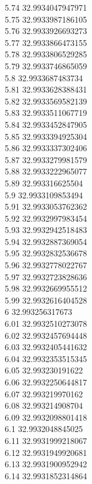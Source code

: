 {5.74	32.9934047947971\\
5.75	32.9933987186105\\
5.76	32.9933926693273\\
5.77	32.9933866473155\\
5.78	32.9933806529285\\
5.79	32.9933746865059\\
5.8	32.9933687483734\\
5.81	32.9933628388431\\
5.82	32.9933569582139\\
5.83	32.9933511067719\\
5.84	32.9933452847905\\
5.85	32.9933394925304\\
5.86	32.9933337302406\\
5.87	32.9933279981579\\
5.88	32.9933222965077\\
5.89	32.993316625504\\
5.9	32.9933109853494\\
5.91	32.9933053762362\\
5.92	32.9932997983454\\
5.93	32.9932942518483\\
5.94	32.9932887369054\\
5.95	32.9932832536678\\
5.96	32.9932778022767\\
5.97	32.9932723828636\\
5.98	32.9932669955512\\
5.99	32.9932616404528\\
6	32.993256317673\\
6.01	32.9932510273078\\
6.02	32.9932457694448\\
6.03	32.9932405441632\\
6.04	32.9932353515345\\
6.05	32.993230191622\\
6.06	32.9932250644817\\
6.07	32.993219970162\\
6.08	32.993214908704\\
6.09	32.9932098801418\\
6.1	32.9932048845025\\
6.11	32.9931999218067\\
6.12	32.9931949920681\\
6.13	32.9931900952942\\
6.14	32.9931852314864\\
}
